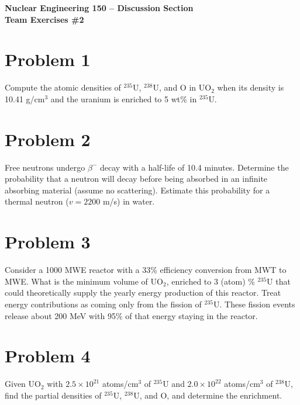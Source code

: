 \documentclass{report}
\begin{document}
\begin{center}
\textbf{\large Nuclear Engineering 150 -- Discussion Section}\\ 
\textbf{Team Exercises \#2}
\end{center}

\section*{Problem 1}

Compute the atomic densities of $^{235}$U, $^{238}$U, and O in UO$_2$ when its density is 10.41 g/cm$^3$ and the uranium is enriched to 5 wt\% in $^{235}$U.



\newpage
\section*{Problem 2}

Free neutrons undergo $\beta^{-}$ decay with a half-life of 10.4 minutes. Determine the probability that a neutron will decay before being absorbed in an infinite absorbing material (assume no scattering). Estimate this probability for a thermal neutron ($v = 2200$ m/s) in water.



\newpage
\section*{Problem 3}

Consider a 1000 MWE reactor with a 33\% efficiency conversion from MWT to MWE. What is the minimum volume of UO$_2$, enriched to 3 (atom) \% $^{235}$U that could theoretically supply the yearly energy production of this reactor. Treat energy contributions as coming only from the fission of $^{235}$U. These fission events release about 200 MeV with 95\% of that energy staying in the reactor.



\newpage
\section*{Problem 4}

Given UO$_2$ with $2.5 \times 10^{21}$ atoms/cm$^3$ of $^{235}$U and $2.0\times10^{22}$ atoms/cm$^3$ of $^{238}$U, find the partial densities of $^{235}$U, $^{238}$U, and O, and determine the enrichment.
\end{document}
